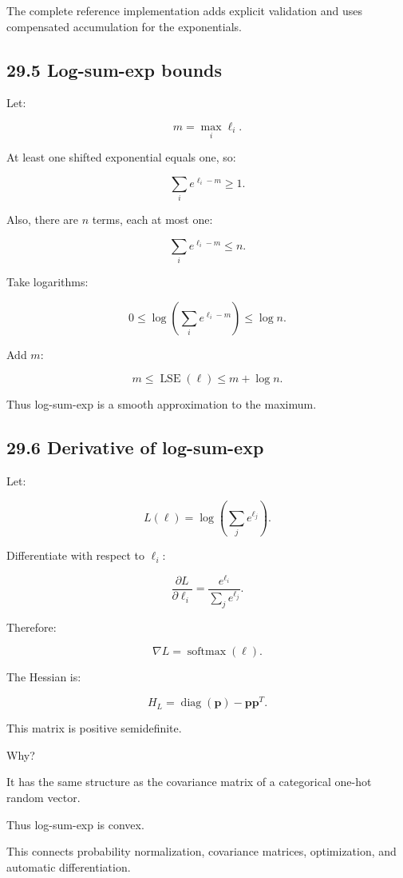 The complete reference implementation adds explicit validation and uses compensated accumulation for the exponentials.

\subsection{29.5 Log-sum-exp bounds}\label{02-foundations-ii-ch031-log-sum-exp-bounds}

Let:

\[ m=\max_i\ell_i. \]

At least one shifted exponential equals one, so:

\[ \sum_ie^{\ell_i-m}\ge1. \]

Also, there are \(n\) terms, each at most one:

\[ \sum_ie^{\ell_i-m}\le n. \]

Take logarithms:

\[ 0\le \log\left(\sum_ie^{\ell_i-m}\right) \le\log n. \]

Add \(m\):

\[ \boxed{ m\le\operatorname{LSE}(\ell)\le m+\log n }. \]

Thus log-sum-exp is a smooth approximation to the maximum.

\subsection{29.6 Derivative of log-sum-exp}\label{02-foundations-ii-ch031-derivative-of-log-sum-exp}

Let:

\[ L(\ell)=\log\left(\sum_je^{\ell_j}\right). \]

Differentiate with respect to \(\ell_i\):

\[ \frac{\partial L}{\partial\ell_i} = \frac{e^{\ell_i}}{\sum_je^{\ell_j}}. \]

Therefore:

\[ \boxed{ \nabla L=\operatorname{softmax}(\ell) }. \]

The Hessian is:

\[ \boxed{ H_L= \operatorname{diag}(\mathbf p)-\mathbf p\mathbf p^T }. \]

This matrix is positive semidefinite.

Why?

It has the same structure as the covariance matrix of a categorical one-hot random vector.

Thus log-sum-exp is convex.

This connects probability normalization, covariance matrices, optimization, and automatic differentiation.

